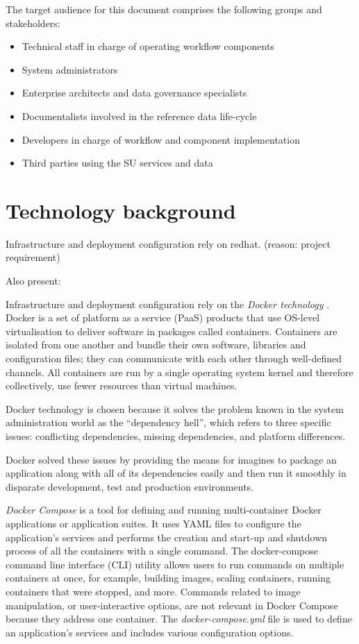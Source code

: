	The target audience for this document comprises the following groups and stakeholders:	
	\begin{itemize}
		\item Technical staff in charge of operating workflow components
		\item System administrators
		\item Enterprise architects and data governance specialists
		\item Documentalists involved in the reference data life-cycle
		\item Developers in charge of workflow and component implementation
		\item Third parties using the SU services and data 
	\end{itemize}	
		
\section{Technology background}
\label{sec:background}

Infrastructure and deployment configuration rely on redhat. (reason: project requirement)

	Also present:

	
	Infrastructure and deployment configuration rely on the \textit{Docker technology} \citep{docker-merkel2014docker, docker}. Docker is a set of platform as a service (PaaS) products that use OS-level virtualisation to deliver software in packages called containers. Containers are isolated from one another and bundle their own software, libraries and configuration files; they can communicate with each other through well-defined channels. All containers are run by a single operating system kernel and therefore collectively, use fewer resources than virtual machines.

	Docker technology is chosen because it solves the problem known in the system administration world as the ``dependency hell'', which refers to three specific issues: conflicting dependencies, missing dependencies, and platform differences.

	Docker solved these issues by providing the means for imagines to package an application along with all of its dependencies easily and then run it smoothly in disparate development, test and production
environments.
		
	\textit{Docker Compose} is a tool for defining and running multi-container Docker applications or application suites. It uses YAML files to configure the application's services and performs the creation and start-up and shutdown process of all the containers with a single command. The docker-compose command line interface (CLI) utility allows users to run commands on multiple containers at once, for example, building images, scaling containers, running containers that were stopped, and more. Commands related to image manipulation, or user-interactive options, are not relevant in Docker Compose because they address one container. The \textit{docker-compose.yml} file is used to define an application's services and includes various configuration options.


